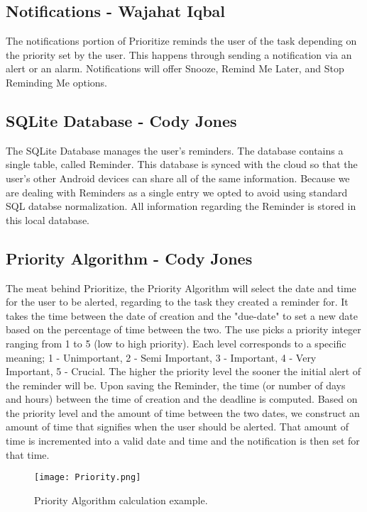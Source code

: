 \documentclass[12pt]{article}
\begin{document}
\subsection{Notifications - Wajahat Iqbal}
The notifications portion of Prioritize reminds the user of the task depending on the priority set by the user. This happens through sending a notification via an alert or an alarm.  Notifications will offer Snooze, Remind Me Later, and Stop Reminding Me options. 

\subsection{SQLite Database - Cody Jones}
The SQLite Database manages the user's reminders. The database contains a single table, called Reminder. This database is synced with the cloud so that the user's other Android devices can share all of the same information. Because we are dealing with Reminders as a single entry we opted to avoid using standard SQL databse normalization. All information regarding the Reminder is stored in this local database. 


\subsection{Priority Algorithm - Cody Jones}
The meat behind Prioritize, the Priority Algorithm will select the date and time for the user to be alerted, regarding to the task they created a reminder for. It takes the time between the date of creation and the "due-date" to set a new date based on the percentage of time between the two. The use picks a priority integer ranging from 1 to 5 (low to high priority). Each level corresponds to a specific meaning; 1 - Unimportant, 2 - Semi Important, 3 - Important, 4 - Very Important, 5 - Crucial. The higher the priority level the sooner the initial alert of the reminder will be. Upon saving the Reminder, the time (or number of days and hours) between the time of creation and the deadline is computed. Based on the priority level and the amount of time between the two dates, we construct an amount of time that signifies when the user should be alerted. That amount of time is incremented into a valid date and time and the notification is then set for that time. 


\begin{figure}[h]
\texttt{[image: Priority.png]}
\centering
\caption{Priority Algorithm calculation example.}
\end{figure}
\end{document}
